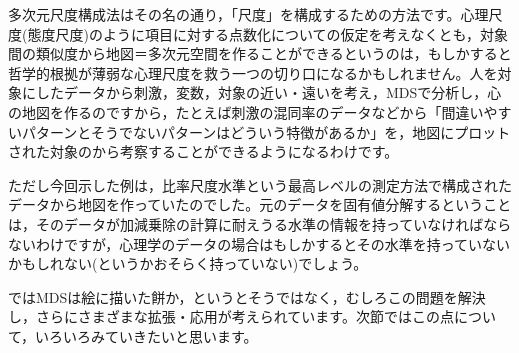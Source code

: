 \documentclass{ltjsbook}
\begin{document}
多次元尺度構成法はその名の通り，「尺度」を構成するための方法です。心理尺度(態度尺度)のように項目に対する点数化についての仮定を考えなくとも，対象間の類似度から地図＝多次元空間を作ることができるというのは，もしかすると哲学的根拠が薄弱な心理尺度を救う一つの切り口になるかもしれません。人を対象にしたデータから刺激，変数，対象の近い・遠いを考え，MDSで分析し，心の地図を作るのですから，たとえば刺激の混同率のデータなどから「間違いやすいパターンとそうでないパターンはどういう特徴があるか」を，地図にプロットされた対象のから考察することができるようになるわけです。

ただし今回示した例は，比率尺度水準という最高レベルの測定方法で構成されたデータから地図を作っていたのでした。元のデータを固有値分解するということは，そのデータが加減乗除の計算に耐えうる水準の情報を持っていなければならないわけですが，心理学のデータの場合はもしかするとその水準を持っていないかもしれない(というかおそらく持っていない)でしょう。

ではMDSは絵に描いた餅か，というとそうではなく，むしろこの問題を解決し，さらにさまざまな拡張・応用が考えられています。次節ではこの点について，いろいろみていきたいと思います。
\end{document}
